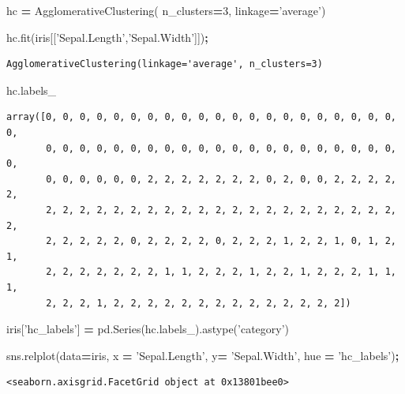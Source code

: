 \documentclass[
  letterpaper,
]{scrbook}
\newenvironment{Shaded}{\begin{snugshade}}{\end{snugshade}}
\newcommand{\DecValTok}[1]{\textcolor[rgb]{0.00,0.00,0.81}{#1}}
\newcommand{\NormalTok}[1]{#1}
\newcommand{\OperatorTok}[1]{\textcolor[rgb]{0.81,0.36,0.00}{\textbf{#1}}}
\newcommand{\StringTok}[1]{\textcolor[rgb]{0.31,0.60,0.02}{#1}}
\begin{document}
\begin{Shaded}
\begin{Highlighting}[]
\NormalTok{hc }\OperatorTok{=}\NormalTok{ AgglomerativeClustering( n_clusters}\OperatorTok{=}\DecValTok{3}\NormalTok{,}
\NormalTok{                             linkage}\OperatorTok{=}\StringTok{'average'}\NormalTok{)}

\NormalTok{hc.fit(iris[[}\StringTok{'Sepal.Length'}\NormalTok{,}\StringTok{'Sepal.Width'}\NormalTok{]])}\OperatorTok{;}
\end{Highlighting}
\end{Shaded}

\begin{verbatim}
AgglomerativeClustering(linkage='average', n_clusters=3)
\end{verbatim}

\begin{Shaded}
\begin{Highlighting}[]
\NormalTok{hc.labels_}
\end{Highlighting}
\end{Shaded}

\begin{verbatim}
array([0, 0, 0, 0, 0, 0, 0, 0, 0, 0, 0, 0, 0, 0, 0, 0, 0, 0, 0, 0, 0, 0,
       0, 0, 0, 0, 0, 0, 0, 0, 0, 0, 0, 0, 0, 0, 0, 0, 0, 0, 0, 0, 0, 0,
       0, 0, 0, 0, 0, 0, 2, 2, 2, 2, 2, 2, 2, 0, 2, 0, 0, 2, 2, 2, 2, 2,
       2, 2, 2, 2, 2, 2, 2, 2, 2, 2, 2, 2, 2, 2, 2, 2, 2, 2, 2, 2, 2, 2,
       2, 2, 2, 2, 2, 0, 2, 2, 2, 2, 0, 2, 2, 2, 1, 2, 2, 1, 0, 1, 2, 1,
       2, 2, 2, 2, 2, 2, 2, 1, 1, 2, 2, 2, 1, 2, 2, 1, 2, 2, 2, 1, 1, 1,
       2, 2, 2, 1, 2, 2, 2, 2, 2, 2, 2, 2, 2, 2, 2, 2, 2, 2])
\end{verbatim}

\begin{Shaded}
\begin{Highlighting}[]
\NormalTok{iris[}\StringTok{'hc_labels'}\NormalTok{] }\OperatorTok{=}\NormalTok{ pd.Series(hc.labels_).astype(}\StringTok{'category'}\NormalTok{)}

\NormalTok{sns.relplot(data}\OperatorTok{=}\NormalTok{iris, x }\OperatorTok{=} \StringTok{'Sepal.Length'}\NormalTok{, y}\OperatorTok{=} \StringTok{'Sepal.Width'}\NormalTok{, }
\NormalTok{           hue }\OperatorTok{=} \StringTok{'hc_labels'}\NormalTok{)}\OperatorTok{;}
\end{Highlighting}
\end{Shaded}

\begin{verbatim}
<seaborn.axisgrid.FacetGrid object at 0x13801bee0>
\end{verbatim}
\end{document}
